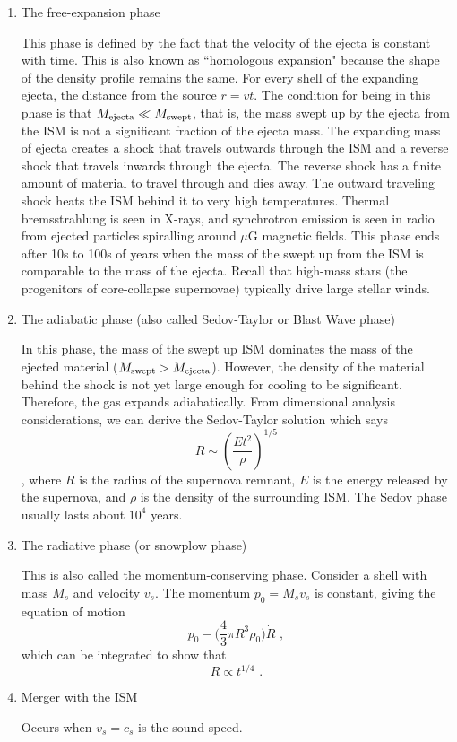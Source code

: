 \begin{enumerate}
    \item The free-expansion phase

    This phase is defined by the fact that the velocity of the ejecta is constant with time. This is also known as ``homologous expansion" because the shape of the density profile remains the same. For every shell of the expanding ejecta, the distance from the source $r = vt$. The condition for being in this phase is that $M_{\rm ejecta} \ll M_{\rm swept}$, that is, the mass swept up by the ejecta from the ISM is not a significant fraction of the ejecta mass.
    The expanding mass of ejecta creates a shock that travels outwards through the ISM
    and a reverse shock that travels inwards through the ejecta.  The reverse shock has a finite
    amount of material to travel through and dies away.
    The outward traveling shock heats the ISM behind it to very high temperatures.
    Thermal bremsstrahlung is seen
    in X-rays, and synchrotron emission is seen in radio from ejected
    particles spiralling around $\mu$G magnetic fields.  This phase ends after 10s to 100s of
    years when the mass of the swept up from the ISM is comparable to the mass of the ejecta.
    Recall that high-mass stars (the progenitors of core-collapse supernovae) typically
    drive large stellar winds.

    \item The adiabatic phase (also called Sedov-Taylor or Blast Wave phase)

    In this phase, the mass of the swept up ISM dominates the mass of the ejected material ($M_{\rm swept} > M_{\rm ejecta}$).
    However, the density of the material behind the shock is not yet large enough for cooling
    to be significant.  Therefore, the gas expands adiabatically.
    From dimensional analysis considerations, we can derive the Sedov-Taylor solution which says
    \begin{dmath}
        R \sim \left(\frac{Et^2}{\rho}\right)^{1/5}
    \end{dmath},
    where $R$ is the radius of the supernova remnant, $E$ is the energy released by the
    supernova, and $\rho$ is the density of the surrounding ISM. The Sedov phase usually lasts about $10^4$ years.

    \item The radiative phase (or snowplow phase)
    
    This is also called the momentum-conserving phase. Consider a shell with mass $M_s$ and velocity $v_s$. The momentum $p_0 = M_s v_s$ is constant, giving the equation of motion
    \begin{equation}
    p_0 - \biggl(\frac{4}{3}\pi R^3 \rho_0 \biggr) \dot{R}\,\, ,
    \end{equation}
    which can be integrated to show that
    \begin{equation}
    R \propto t^{1/4}\,\,.
    \end{equation}
    \item Merger with the ISM
    
    Occurs when $v_s = c_s$ is the sound speed.
\end{enumerate}

